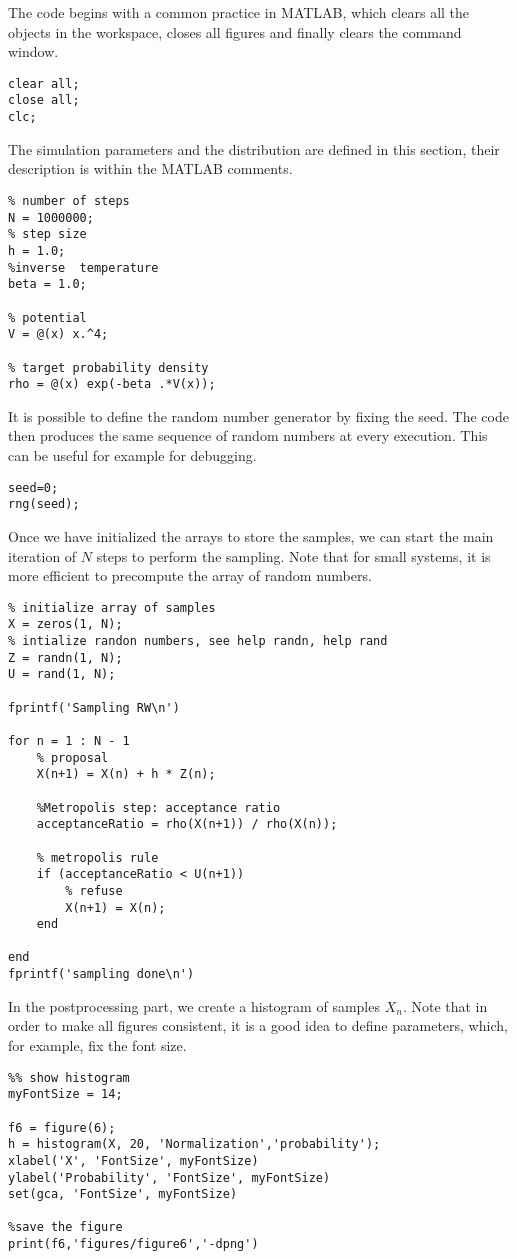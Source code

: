 \documentclass{scrartcl}
\begin{document}
The code begins with a common practice in MATLAB, which clears all the objects in the workspace, closes all figures and finally clears the command window.
\begin{verbatim}
clear all;
close all;
clc;
\end{verbatim}
The simulation parameters and the distribution are defined in this section, their description is within the MATLAB comments.
\begin{verbatim}
% number of steps 
N = 1000000;
% step size
h = 1.0;
%inverse  temperature 
beta = 1.0;

% potential
V = @(x) x.^4;

% target probability density
rho = @(x) exp(-beta .*V(x));
\end{verbatim}
It is possible to define the random number generator by fixing the seed. The code then produces the same sequence of random numbers at every execution. This can be useful for example for debugging.
\begin{verbatim}
seed=0;
rng(seed);
\end{verbatim}
Once we have initialized the arrays to store the samples, we can start the main iteration of $N$ steps to perform the sampling. Note that for small systems, it is more efficient to precompute the array of random numbers.
\begin{verbatim}
% initialize array of samples
X = zeros(1, N); 
% intialize randon numbers, see help randn, help rand
Z = randn(1, N);
U = rand(1, N);

fprintf('Sampling RW\n')

for n = 1 : N - 1    
    % proposal 
    X(n+1) = X(n) + h * Z(n);
    
    %Metropolis step: acceptance ratio
    acceptanceRatio = rho(X(n+1)) / rho(X(n));
    
    % metropolis rule
    if (acceptanceRatio < U(n+1))
        % refuse
        X(n+1) = X(n);
    end
    
end
fprintf('sampling done\n')
\end{verbatim}
In the postprocessing part, we create a histogram of samples $X_n$. Note that in order to make all figures consistent, it is a good idea to define parameters, which, for example, fix the font size. 
\begin{verbatim}
%% show histogram
myFontSize = 14;

f6 = figure(6);
h = histogram(X, 20, 'Normalization','probability');
xlabel('X', 'FontSize', myFontSize)
ylabel('Probability', 'FontSize', myFontSize)
set(gca, 'FontSize', myFontSize)

%save the figure
print(f6,'figures/figure6','-dpng')
\end{verbatim}
\end{document}
